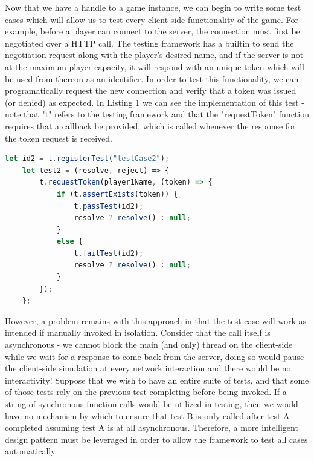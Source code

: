 \documentclass[conference]{IEEEtran}
\begin{document}
Now that we have a handle to a game instance, we can begin to write some test cases which will allow us to test every client-side functionality of the game. For example, before a player can
connect to the server, the connection must first be negotiated over a HTTP call. The testing framework has a builtin to send the negotiation request along with the player's desired name, and if the 
server is not at the maximum player capacity, it will respond with an unique token which will be used from thereon as an identifier. In order to test this functionality, we can programatically request
the new connection and verify that a token was issued (or denied) as expected. In Listing 1 we can see the implementation of this test - note that "t" refers to the testing framework and that the "requestToken"
function requires that a callback be provided, which is called whenever the response for the token request is received. 

\begin{lstlisting}[language=JavaScript,caption={Snippet of Test Case for Requesting a Token}]
    let id2 = t.registerTest("testCase2");
    let test2 = (resolve, reject) => {
        t.requestToken(player1Name, (token) => {
            if (t.assertExists(token)) {
                t.passTest(id2);
                resolve ? resolve() : null;
            }
            else {
                t.failTest(id2);
                resolve ? resolve() : null;
            }
        });
    };
\end{lstlisting}


However, a problem remains with this approach in that the test case will work as intended if manually invoked in isolation. Consider that the call itself is asynchronous - we cannot block the 
main (and only) thread on the client-side while we wait for a response to come back from the server, doing so would pause the client-side simulation at every network interaction and there would be no interactivity! 
Suppose that we wish to have an entire suite of tests, and that some of those tests rely on the previous test completing before being invoked. If a string of synchronous function calls would be utilized
in testing, then we would have no mechanism by which to ensure that test B is only called after test A completed assuming test A is at all asynchronous. Therefore, a more intelligent design pattern must 
be leveraged in order to allow the framework to test all cases automatically.  
\end{document}
